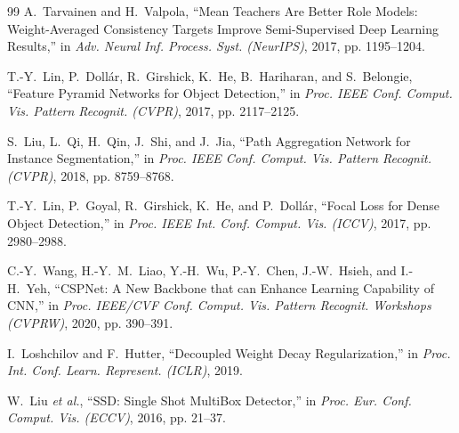 \documentclass[conference]{IEEEtran}
\begin{document}
\begin{thebibliography}{99}
A.~Tarvainen and H.~Valpola, ``Mean Teachers Are Better Role Models: Weight-Averaged Consistency Targets Improve Semi-Supervised Deep Learning Results,'' in \textit{Adv. Neural Inf. Process. Syst. (NeurIPS)}, 2017, pp. 1195--1204.

T.-Y.~Lin, P.~Doll{\'a}r, R.~Girshick, K.~He, B.~Hariharan, and S.~Belongie, ``Feature Pyramid Networks for Object Detection,'' in \textit{Proc. IEEE Conf. Comput. Vis. Pattern Recognit. (CVPR)}, 2017, pp. 2117--2125.

S.~Liu, L.~Qi, H.~Qin, J.~Shi, and J.~Jia, ``Path Aggregation Network for Instance Segmentation,'' in \textit{Proc. IEEE Conf. Comput. Vis. Pattern Recognit. (CVPR)}, 2018, pp. 8759--8768.

T.-Y.~Lin, P.~Goyal, R.~Girshick, K.~He, and P.~Doll{\'a}r, ``Focal Loss for Dense Object Detection,'' in \textit{Proc. IEEE Int. Conf. Comput. Vis. (ICCV)}, 2017, pp. 2980--2988.

C.-Y.~Wang, H.-Y.~M.~Liao, Y.-H.~Wu, P.-Y.~Chen, J.-W.~Hsieh, and I.-H.~Yeh, ``CSPNet: A New Backbone that can Enhance Learning Capability of CNN,'' in \textit{Proc. IEEE/CVF Conf. Comput. Vis. Pattern Recognit. Workshops (CVPRW)}, 2020, pp. 390--391.

I.~Loshchilov and F.~Hutter, ``Decoupled Weight Decay Regularization,'' in \textit{Proc. Int. Conf. Learn. Represent. (ICLR)}, 2019.

W.~Liu \textit{et al.}, ``SSD: Single Shot MultiBox Detector,'' in \textit{Proc. Eur. Conf. Comput. Vis. (ECCV)}, 2016, pp. 21--37.

\end{thebibliography}
\end{document}
